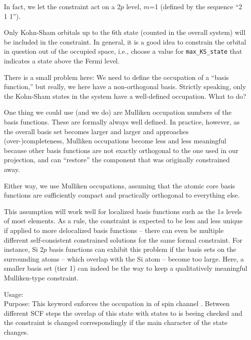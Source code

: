   In fact, we let the constraint act on a 2$p$ level, $m$=1 (defined
  by the sequence ``2 1 1'').

  Only Kohn-Sham orbitals up to the 6th state (counted in the overall
  system) will be included in the constraint. In general, it is a good
  idea to constrain the orbital in question out of the occupied space,
  i.e., choose a value for \texttt{max\_KS\_state} that indicates a
  state above the Fermi level.

  There is a small problem here: We need to define the occupation of a
  ``basis function,'' but   really, we here have a non-orthogonal
  basis. Strictly speaking, only the Kohn-Sham states    in the system
  have a well-defined occupation. What to do? 

  One thing we could use (and we do) are Mulliken occupation numbers
  of the basis functions. These are formally always well defined. In
  practice, however, as the overall basis set becomes larger and
  larger and approaches (over-)completeness, Mulliken occupations
  become less and less meaningful because other basis functions are
  not exactly orthogonal to the one used in our projection, and can
  ``restore'' the component that was originally constrained away. 

  Either way, we use Mulliken occupations, assuming that the atomic
  core basis functions are sufficiently compact and practically
  orthogonal to everything else.  

  This assumption will work well for localized basis functions
  such as the 1$s$ levels of most elements. As a rule, the constraint
  is expected to be less and less unique if applied to more
  delocalized basis functions -- there can even be multiple
  different self-consistent constrained solutions for the same formal
  constraint. For instance, Si 2$p$ basis functions can exhibit this
  problem if the basis sets on the surrounding atoms -- which overlap
  with the Si atom -- become too large. Here, a smaller basis set
  (tier 1) can indeed be the way to keep a qualitatively meaningful
  Mulliken-type constraint.


{
  \noindent
  Usage:       \\[1.0ex]
  Purpose: This keyword enforces the occupation  in 
     of spin channel . Between different SCF steps the overlap of this state 
     with states  to  is beeing checked and the 
     constraint is changed correspondingly if the main character of the state changes. \\
}

